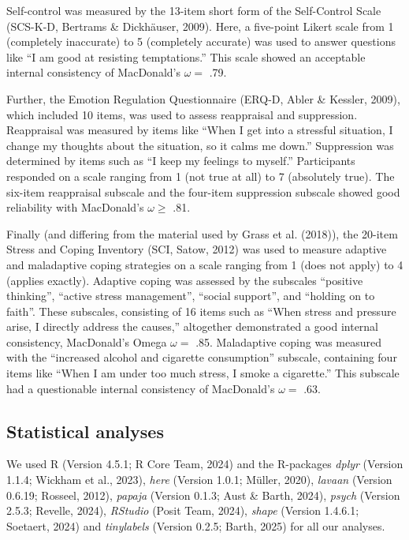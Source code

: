 \documentclass[
  man]{apa6}
\begin{document}
Self-control was measured by the 13-item short form of the Self-Control Scale (SCS-K-D, Bertrams \& Dickhäuser, 2009).
Here, a five-point Likert scale from 1 (completely inaccurate) to 5 (completely accurate) was used to answer questions like ``I am good at resisting temptations.''
This scale showed an acceptable internal consistency of MacDonald's \(\omega=\) .79.

Further, the Emotion Regulation Questionnaire (ERQ-D, Abler \& Kessler, 2009), which included 10 items, was used to assess reappraisal and suppression. Reappraisal was measured by items like ``When I get into a stressful situation, I change my thoughts about the situation, so it calms me down.''
Suppression was determined by items such as ``I keep my feelings to myself.''
Participants responded on a scale ranging from 1 (not true at all) to 7 (absolutely true).
The six-item reappraisal subscale and the four-item suppression subscale showed good reliability with MacDonald's \(\omega\ge\) .81.

Finally (and differing from the material used by Grass et al. (2018)), the 20-item Stress and Coping Inventory (SCI, Satow, 2012) was used to measure adaptive and maladaptive coping strategies on a scale ranging from 1 (does not apply) to 4 (applies exactly).
Adaptive coping was assessed by the subscales ``positive thinking'', ``active stress management'', ``social support'', and ``holding on to faith''.
These subscales, consisting of 16 items such as ``When stress and pressure arise, I directly address the causes,'' altogether demonstrated a good internal consistency, MacDonald's Omega \(\omega=\) .85.
Maladaptive coping was measured with the ``increased alcohol and cigarette consumption'' subscale, containing four items like ``When I am under too much stress, I smoke a cigarette.''
This subscale had a questionable internal consistency of MacDonald's \(\omega=\) .63.

\subsection{Statistical analyses}\label{statistical-analyses}

We used R (Version 4.5.1; R Core Team, 2024) and the R-packages \emph{dplyr} (Version 1.1.4; Wickham et al., 2023), \emph{here} (Version 1.0.1; Müller, 2020), \emph{lavaan} (Version 0.6.19; Rosseel, 2012), \emph{papaja} (Version 0.1.3; Aust \& Barth, 2024), \emph{psych} (Version 2.5.3; Revelle, 2024), \emph{RStudio} (Posit Team, 2024), \emph{shape} (Version 1.4.6.1; Soetaert, 2024) and \emph{tinylabels} (Version 0.2.5; Barth, 2025) for all our analyses.
\end{document}
